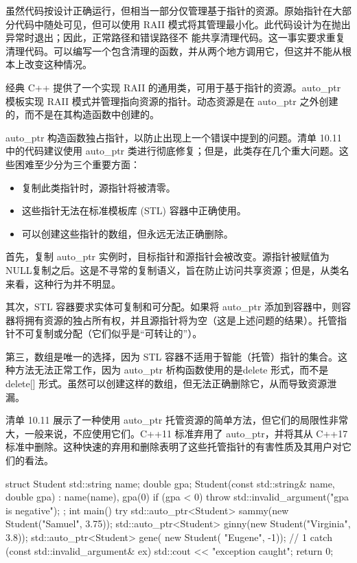 
虽然代码按设计正确运行，但相当一部分仅管理基于指针的资源。原始指针在大部分代码中随处可见，但可以使用 RAII 模式将其管理最小化。此代码设计为在抛出异常时退出；因此，正常路径和错误路径不 能共享清理代码。这一事实要求重复清理代码。可以编写一个包含清理的函数，并从两个地方调用它，但这并不能从根本上改变这种情况。

经典 C++ 提供了一个实现 RAII 的通用类，可用于基于指针的资源。auto\_ptr 模板实现 RAII 模式并管理指向资源的指针。动态资源是在 auto\_ptr 之外创建的，而不是在其构造函数中创建的。

auto\_ptr 构造函数独占指针，以防止出现上一个错误中提到的问题。清单 10.11 中的代码建议使用 auto\_ptr 类进行彻底修复；但是，此类存在几个重大问题。这些困难至少分为三个重要方面：

\begin{itemize}
\item
复制此类指针时，源指针将被清零。

\item
这些指针无法在标准模板库 (STL) 容器中正确使用。

\item
可以创建这些指针的数组，但永远无法正确删除。
\end{itemize}

首先，复制 auto\_ptr 实例时，目标指针和源指针会被改变。源指针被赋值为 NULL复制之后。这是不寻常的复制语义，旨在防止访问共享资源；但是，从类名来看，这种行为并不明显。

其次，STL 容器要求实体可复制和可分配。如果将 auto\_ptr 添加到容器中，则容器将拥有资源的独占所有权，并且源指针将为空（这是上述问题的结果）。托管指针不可复制或分配（它们似乎是“可转让的”）。

第三，数组是唯一的选择，因为 STL 容器不适用于智能（托管）指针的集合。这种方法无法正常工作，因为 auto\_ptr 析构函数使用的是delete 形式，而不是 delete[] 形式。虽然可以创建这样的数组，但无法正确删除它，从而导致资源泄漏。

清单 10.11 展示了一种使用 auto\_ptr 托管资源的简单方法，但它们的局限性非常大，一般来说，不应使用它们。C++11 标准弃用了 auto\_ptr，并将其从 C++17 标准中删除。这种快速的弃用和删除表明了这些托管指针的有害性质及其用户对它们的看法。


\begin{cpp}
struct Student {
  std::string name;
  double gpa;
  Student(const std::string& name, double gpa) : name(name), gpa(0) {
    if (gpa < 0)
      throw std::invalid_argument("gpa is negative");
  }
};
int main() {
  try {
    std::auto_ptr<Student> sammy(new Student("Samuel", 3.75));
    std::auto_ptr<Student> ginny(new Student("Virginia", 3.8));
    std::auto_ptr<Student> gene(
    new Student( "Eugene", -1)); // 1
  } catch (const std::invalid_argument& ex) {
    std::cout << "exception caught\n";
  }
  return 0;
}
\end{cpp}

